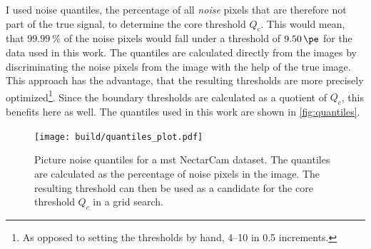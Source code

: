 I used noise quantiles, \ie the percentage of all \textit{noise} pixels that are therefore not part of the true signal,
to determine the core threshold \(Q_c\). This would mean, that \eg \(\SI{99.99}{\percent}\)
of the noise pixels would fall under a threshold of \(\SI{9.50}{\pe}\) for the data used in this work. The quantiles are calculated directly from the images by
discriminating the noise pixels from the image with the help of the true image. This approach has the
advantage, that the resulting thresholds are more precisely optimized\footnote{As opposed to setting the thresholds by hand, \eg \numrange{4}{10} in \num{0.5} increments.}.
Since the boundary thresholds are calculated as a quotient of \(Q_c\), this benefits here as well.
The quantiles used in this work are shown in \autoref{fig:quantiles}.
\begin{figure}
    \centering
    \texttt{[image: build/quantiles\_plot.pdf]}
    \caption{Picture noise quantiles for a \gls{mst} NectarCam dataset. The quantiles are calculated
    as the percentage of noise pixels in the image. The resulting threshold can then be used as a
    candidate for the core threshold \(Q_c\) in a grid search.}
    \label{fig:quantiles}
    \vspace{-0.5cm}
\end{figure}

